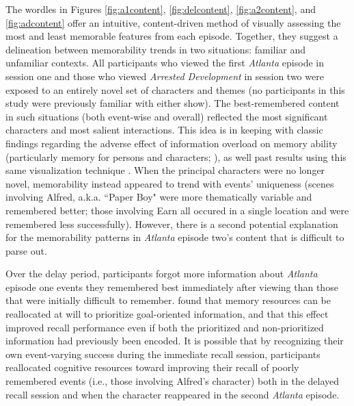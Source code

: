 \documentclass{article}
\begin{document}
The wordles in Figures \ref{fig:a1content}, \ref{fig:delcontent}, \ref{fig:a2content}, and \ref{fig:adcontent} offer an intuitive, content-driven method of visually assessing the most and least memorable features from each episode.  Together, they suggest a delineation between memorability trends in two situations: familiar and unfamiliar contexts.  All participants who viewed the first \textit{Atlanta} episode in session one and those who viewed \textit{Arrested Development} in session two were exposed to an entirely novel set of characters and themes (no participants in this study were previously familiar with either show).  The best-remembered content in such situations (both event-wise and overall) reflected the most significant characters and most salient interactions.  This idea is in keeping with classic findings regarding the adverse effect of information overload on memory ability (particularly memory for persons and characters; \citealp{BargThei85}), as well past results using this same visualization technique \citep{HeusEtal18c}.  When the principal characters were no longer novel, memorability instead appeared to trend with events' uniqueness (scenes involving Alfred, a.k.a. ``Paper Boy" were more thematically variable and remembered better; those involving Earn all occured in a single location and were remembered less successfully).  However, there is a second potential explanation for the memorability patterns in \textit{Atlanta} episode two's content that is difficult to parse out. 

Over the delay period, participants forgot more information about \textit{Atlanta} episode one events they remembered best immediately after viewing than those that were initially difficult to remember.  \cite{BaysEtal11} found that memory resources can be reallocated at will to prioritize goal-oriented information, and that this effect improved recall performance even if both the prioritized and non-prioritized information had previously been encoded. It is possible that by recognizing their own event-varying success during the immediate recall session, participants reallocated cognitive resources toward improving their recall of poorly remembered events (i.e., those involving Alfred's character) both in the delayed recall session and when the character reappeared in the second \textit{Atlanta} episode.  
 
\end{document}
